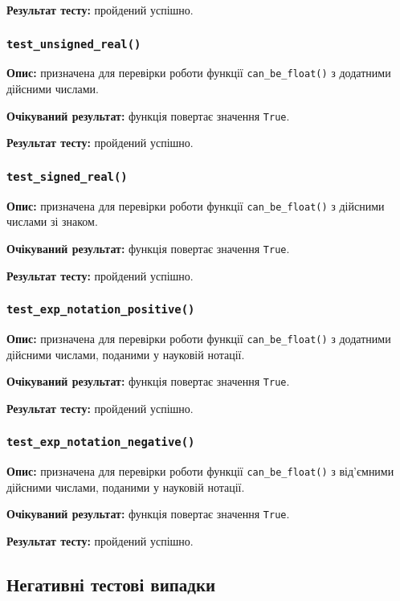 \documentclass[a4paper,oneside,DIV=12,12pt]{scrartcl}
\newcommand{\funcname}[1]{\texttt{#1}}
\newcommand{\caseattrib}[1]{\noindent\textbf{#1}}
\newcommand{\printtrue}{\texttt{True}}
\begin{document}
				\caseattrib{Результат тесту:} пройдений успішно.
				
			\subsubsection{\funcname{test\_unsigned\_real()}}
				\caseattrib{Опис:} призначена для перевірки роботи функції \verb|can_be_float()| з додатними дійсними числами.
				
				\caseattrib{Очікуваний результат:} функція повертає значення \printtrue.
				
				\caseattrib{Результат тесту:} пройдений успішно.
			
			\subsubsection{\funcname{test\_signed\_real()}}
				\caseattrib{Опис:} призначена для перевірки роботи функції \verb|can_be_float()| з дійсними числами зі знаком.
				
				\caseattrib{Очікуваний результат:} функція повертає значення \printtrue.
				
				\caseattrib{Результат тесту:} пройдений успішно.
				
			\subsubsection{\funcname{test\_exp\_notation\_positive()}}
				\caseattrib{Опис:} призначена для перевірки роботи функції \verb|can_be_float()| з додатними дійсними числами, поданими у науковій нотації.
				
				\caseattrib{Очікуваний результат:} функція повертає значення \printtrue.
				
				\caseattrib{Результат тесту:} пройдений успішно.
				
			\subsubsection{\funcname{test\_exp\_notation\_negative()}}
				\caseattrib{Опис:} призначена для перевірки роботи функції \verb|can_be_float()| з від'ємними дійсними числами, поданими у науковій нотації.
				
				\caseattrib{Очікуваний результат:} функція повертає значення \printtrue.
				
				\caseattrib{Результат тесту:} пройдений успішно.
			
		\subsection{Негативні тестові випадки}
			
\end{document}
